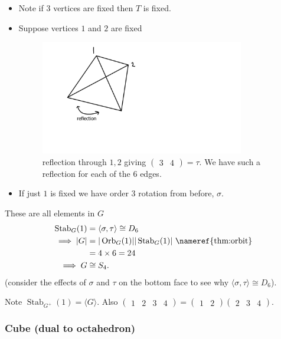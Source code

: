 \begin{itemize}
    \item Note if $3$ vertices are fixed then $T$ is fixed.

    \item Suppose vertices $1$ and $2$ are fixed
    \begin{figure} 
        \centering 
        \includegraphics[height=5cm]{figures/07-tetrahedron-12-fixed} 
        \caption{reflection through $1, 2$ giving $\begin{pmatrix}3 & 4\end{pmatrix} = \tau$. We have such a reflection for each of the $6$ edges.}
    \end{figure}

    \item If just $1$ is fixed we have order $3$ rotation from before, $\sigma$.
\end{itemize} 
These are all elements in $G$
\begin{align*}
    \operatorname{Stab}_G(1) &= \langle \sigma, \tau \rangle \cong D_6 \\
    \implies |G| &= |\operatorname{Orb}_G(1)| |\operatorname{Stab}_G(1)| \text{ \nameref{thm:orbit}}\\
    &= 4 \times 6 = 24 \\
    \implies G &\cong S_4.
\end{align*} (consider the effects of $\sigma$ and $\tau$ on the bottom face to see why $\langle \sigma, \tau \rangle \cong D_6$).

Note $\operatorname{Stab}_{G^+}(1) = \langle G \rangle$.
Also $\begin{pmatrix}1 & 2 & 3 & 4\end{pmatrix} = \begin{pmatrix}1 & 2\end{pmatrix} \begin{pmatrix}2 & 3 & 4\end{pmatrix}$.

\subsubsection{Cube (dual to octahedron)}

